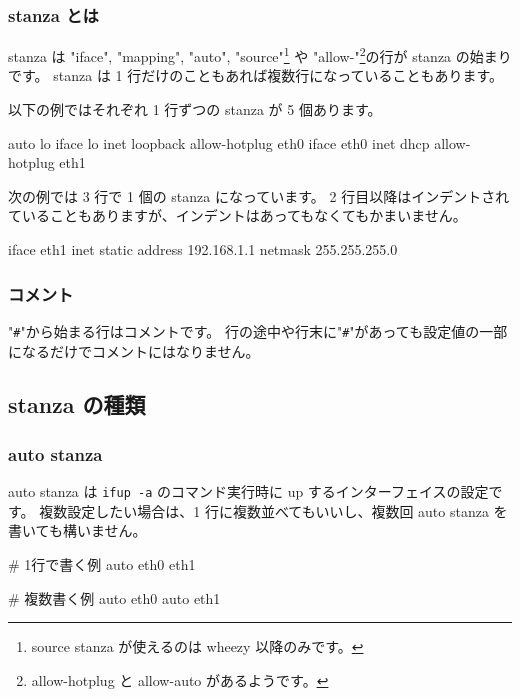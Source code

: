 \documentclass[mingoth,a4paper,twoside]{jsarticle}
\begin{document}
\subsubsection{stanza とは}

stanza は "iface", "mapping", "auto", "source"\footnote{source stanza が使えるのは wheezy 以降のみです。} や "allow-"\footnote{allow-hotplug と allow-auto があるようです。}の行が stanza の始まりです。
stanza は 1 行だけのこともあれば複数行になっていることもあります。

以下の例ではそれぞれ 1 行ずつの stanza が 5 個あります。

\begin{commandline}
auto lo
iface lo inet loopback
allow-hotplug eth0
iface eth0 inet dhcp
allow-hotplug eth1
\end{commandline}

次の例では 3 行で 1 個の stanza になっています。
2 行目以降はインデントされていることもありますが、インデントはあってもなくてもかまいません。

\begin{commandline}
iface eth1 inet static
    address 192.168.1.1
    netmask 255.255.255.0
\end{commandline}

\subsubsection{コメント}

"\verb+#+"から始まる行はコメントです。
行の途中や行末に"\verb+#+"があっても設定値の一部になるだけでコメントにはなりません。

\subsection{stanza の種類}

\subsubsection{auto stanza}

auto stanza は \verb+ifup -a+ のコマンド実行時に up するインターフェイスの設定です。
複数設定したい場合は、1 行に複数並べてもいいし、複数回 auto stanza を書いても構いません。

\begin{commandline}
# 1行で書く例
auto eth0 eth1
\end{commandline}

\begin{commandline}
# 複数書く例
auto eth0
auto eth1
\end{commandline}
\end{document}
